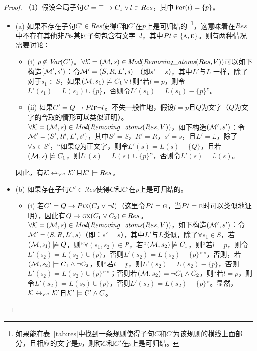 \begin{proof}
（1）假设全局子句$C=\top\rightarrow C_1 \vee l \in Res$，其中$\textit{Var}(l)=\{p\}$。
\begin{itemize}
	\item[] (a) 如果不存在子句$C'\in Res$使得$C$和$C'$在$p$上是可归结的~\footnote{如果能在表~\ref{tab:res}中找到一条规则使得子句$C$和$C'$为该规则的横线上面部分，且相应的文字是$p$，则称$C$和$C'$在$p$上是可归结。}，这意味着在$Res$中不存在其他非$Pt$-某时子句包含有文字$\neg l$，其中$Pt\in \{\textsc{a},\textsc{e}\}$。则有两种情况需要讨论：
	\begin{itemize}
		\item[] (i) $p \not \in \textit{Var}(C')$。$\forall {\cal K}=({\cal M}, s)\in \textit{Mod}(\emph{Removing\_atoms}(Res, V))$可以如下构造$({\cal M}',s')$：令${\cal M}'= (S, R, L',s)$ （即$s'=s$），其中$L'$与$L$ 一样，除了对于$s_1\in S$，如果$({\cal M}, s_1) \not \models C_1 \vee l$则“若$l=p$，则令$L'(s_1) = L(s_1) \cup \{p\}$，否则令$L'(s_1) = L(s_1) - \{p\}$”。
		\item[] (ii) 如果$C'= Q\rightarrow Pt \textsc{f} \neg l$。不失一般性地，假设$l=p$且$Q$为文字（$Q$为文字的合取的情形可以类似证明）。$\forall {\cal K}=({\cal M}, s)\in \textit{Mod}(\emph{Removing\_atoms}(Res, V))$，如下构造$({\cal M}',s')$：令 ${\cal M}'=(S', R', L', s')$，其中$S'=S$，$R'=R$，$s'=s$，且$L'=L$，除了$\forall s\in S'$，“如果$Q$为正文字，则令$L'(s) = L(s) - \{Q\}$，且若$({\cal M}, s) \not \models C_1$，则$L'(s) = L(s) \cup \{p\}$”，否则令$L'(s) = L(s)$。
	\end{itemize}
	因此，有${\cal K} \leftrightarrow_{V''} {\cal K}'$且${\cal K}' \models Res$。
	\item[] (b)	如果存在子句$C'\in Res$使得$C$和$C'$在$p$上是可归结的。
		\begin{itemize}
		\item[] (i) 若$C'= Q\rightarrow Pt \textsc{x} (C_2 \vee \neg l)$（这里令$Pt=\textsc{g}$，当$Pt = \textsc{e}$时可以类似地证明），因此有$Q\rightarrow \textsc{g} \textsc{x}(C_1 \vee C_2) \in Res$。$\forall {\cal K}=({\cal M}, s)\in \textit{Mod}(\emph{Removing\_atoms}(Res, V))$，如下构造$({\cal M}',s')$：令${\cal M}'= (S, R, L',s)$（即：$s'=s$），其中$L'$与$L$类似，除了$\forall s_1\in S$，若$({\cal M}, s_1) \not \models Q$，则“$\forall (s_1, s_2) \in R$，若“$({\cal M}, s_2) \not \models C_1$，则“若$l=p$，则令$L'(s_2) = L(s_2) \cup \{p\}$，否则$L'(s_2) = L(s_2) - \{p\}$””，否则，若$({\cal M}, s_2) \models  C_1 \wedge \neg C_2$，则“若$l=p$，则$L'(s_2) = L(s_2) - \{p\}$，否则$L'(s_2) = L(s_2) \cup \{p\}$””；否则若$({\cal M}, s_2) \models \neg C_1 \wedge C_2$，则“若$l=p$，则令$L'(s_2) = L(s_2) \cup \{p\}$，否则$L'(s_2) = L(s_2) - \{p\}$”。显然，${\cal K} \leftrightarrow_{V''} {\cal K}'$且${\cal K}' \models C' \wedge C$。

\end{itemize}
\end{itemize}
\end{proof}
